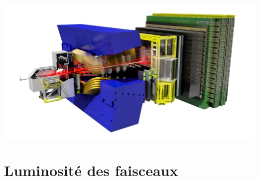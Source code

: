 \marginpar
{
	
	\includegraphics[width=\marginparwidth]{LHC/lhcb.png}
    	\label{lhcb}
}

\section{Luminosité des faisceaux}
